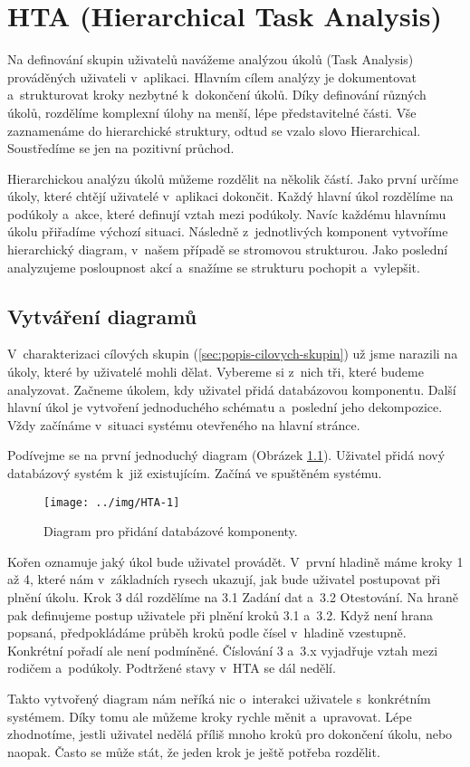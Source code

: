 \chapter{HTA (Hierarchical Task Analysis)}

Na definování skupin uživatelů navážeme analýzou úkolů (Task Analysis) prováděných uživateli v~aplikaci. Hlavním cílem analýzy je dokumentovat a~strukturovat kroky nezbytné k~dokončení úkolů. Díky definování různých úkolů, rozdělíme komplexní úlohy na menší, lépe představitelné části. Vše zaznamenáme do hierarchické struktury, odtud se vzalo slovo Hierarchical. Soustředíme se jen na pozitivní průchod.

Hierarchickou analýzu úkolů můžeme rozdělit na několik částí. Jako první určíme úkoly, které chtějí uživatelé v~aplikaci dokončit. Každý hlavní úkol rozdělíme na podúkoly a~akce, které definují vztah mezi podúkoly. Navíc každému hlavnímu úkolu přiřadíme výchozí situaci. Následně z~jednotlivých komponent vytvoříme hierarchický diagram, v~našem případě se stromovou strukturou. Jako poslední analyzujeme posloupnost akcí a~snažíme se strukturu pochopit a~vylepšit.

\section{Vytváření diagramů}

V~charakterizaci cílových skupin (\ref{sec:popis-cilovych-skupin}) už jsme narazili na úkoly, které by uživatelé mohli dělat. Vybereme si z~nich tři, které budeme analyzovat. Začneme úkolem, kdy uživatel přidá databázovou komponentu. Další hlavní úkol je vytvoření jednoduchého schématu a~poslední jeho dekompozice. Vždy začínáme v~situaci systému otevřeného na hlavní stránce.

Podívejme se na první jednoduchý diagram (Obrázek \ref{obr03:hta1}). Uživatel přidá nový databázový systém k~již existujícím. Začíná ve spuštěném systému.

\begin{figure}[htb]
  \centering
  \texttt{[image: ../img/HTA-1]}
  \caption{Diagram pro přidání databázové komponenty.}
  \label{obr03:hta1}
\end{figure}

Kořen oznamuje jaký úkol bude uživatel provádět. V~první hladině máme kroky 1 až 4, které nám v~základních rysech ukazují, jak bude uživatel postupovat při plnění úkolu. Krok 3 dál rozdělíme na 3.1 Zadání dat a~3.2 Otestování. Na hraně pak definujeme postup uživatele při plnění kroků 3.1 a~3.2. Když není hrana popsaná, předpokládáme průběh kroků podle čísel v~hladině vzestupně. Konkrétní pořadí ale není podmíněné. Číslování 3 a~3.x vyjadřuje vztah mezi rodičem a~podúkoly.  Podtržené stavy v~HTA se dál nedělí. 

Takto vytvořený diagram nám neříká nic o~interakci uživatele s~konkrétním systémem. Díky tomu ale můžeme kroky rychle měnit a~upravovat. Lépe zhodnotíme, jestli uživatel nedělá příliš mnoho kroků pro dokončení úkolu, nebo naopak. Často se může stát, že jeden krok je ještě potřeba rozdělit.

